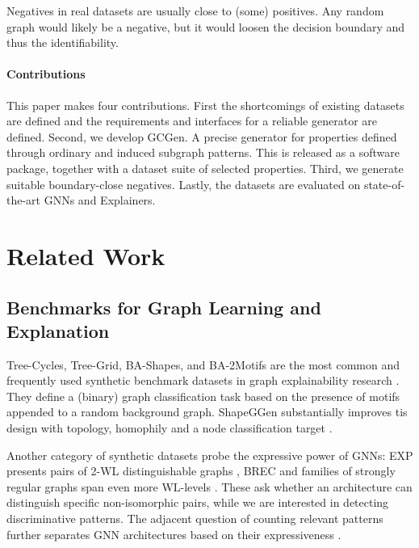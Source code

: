 \documentclass[11pt,twocolumn]{article}
\begin{document}
Negatives in real datasets are usually close to (some) positives.
Any random graph would likely be a negative, but it would loosen the decision boundary and thus the identifiability.


\paragraph{Contributions}
This paper makes four contributions.
First the shortcomings of existing datasets are defined and the requirements and interfaces for a reliable generator are defined.
Second, we develop GCGen. A precise generator for properties defined through ordinary and induced subgraph patterns. This is released as a software package, together with a dataset suite of selected properties.
Third, we generate suitable boundary-close negatives.
Lastly, the datasets are evaluated on state-of-the-art GNNs and Explainers.


\section{Related Work}



\subsection{Benchmarks for Graph Learning and Explanation}

Tree-Cycles, Tree-Grid, BA-Shapes, and BA-2Motifs are the most common and frequently used synthetic benchmark datasets in graph explainability research \cite{yingGNNExplainerGeneratingExplanations2019, luoParameterizedExplainerGraph2020}. They define a (binary) graph classification task based on the presence of motifs appended to a random background graph. 
ShapeGGen substantially improves tis design with topology, homophily and a node classification target \cite{agarwalEvaluatingExplainabilityGraph2023}.


Another category of synthetic datasets probe the expressive power of GNNs: EXP presents pairs of 2-WL distinguishable graphs \cite{abboudSurprisingPowerGraph2021}, BREC and families of strongly regular graphs span even more WL-levels  \cite{wangEmpiricalStudyRealized2024, balcilarBreakingLimitsMessage2021}.
These ask whether an architecture can distinguish specific non-isomorphic pairs, while we are interested in detecting discriminative patterns.
The adjacent question of counting relevant patterns further separates GNN architectures based on their expressiveness \cite{chenCanGraphNeural2020}.
\end{document}

